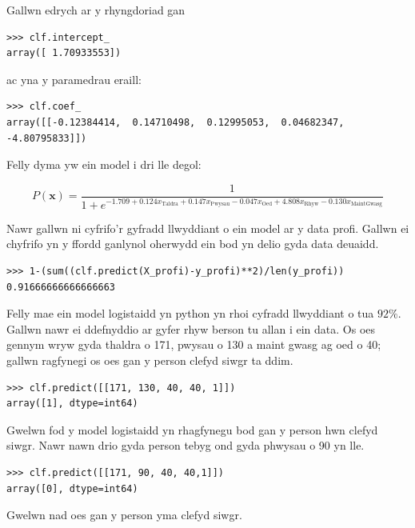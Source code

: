Gallwn edrych ar y rhyngdoriad gan

\begin{verbatim}
>>> clf.intercept_
array([ 1.70933553])
\end{verbatim}

ac yna y paramedrau eraill:

\begin{verbatim}
>>> clf.coef_
array([[-0.12384414,  0.14710498,  0.12995053,  0.04682347, -4.80795833]])
\end{verbatim}

Felly dyma yw ein model i dri lle degol:

$$ P(\mathbf{x}) = \frac{1}{1 + e^{-1.709 + 0.124 x_{\text{Taldra}} + 0.147 x_{\text{Pwysau}} - 0.047 x_{\text{Oed}} + 4.808 x_{\text{Rhyw}} - 0.130 x_{\text{MaintGwasg}}}} $$

Nawr gallwn ni cyfrifo'r gyfradd llwyddiant o ein model ar y data profi. Gallwn ei chyfrifo yn y ffordd ganlynol oherwydd ein bod yn delio gyda data deuaidd.

\begin{verbatim}
>>> 1-(sum((clf.predict(X_profi)-y_profi)**2)/len(y_profi))
0.91666666666666663
\end{verbatim}

Felly mae ein model logistaidd yn python yn rhoi cyfradd llwyddiant o tua $92\%$. Gallwn nawr ei ddefnyddio ar gyfer rhyw berson tu allan i ein data. Os oes gennym wryw gyda thaldra o 171, pwysau o 130 a maint gwasg ag oed o 40; gallwn ragfynegi os oes gan y person clefyd siwgr ta ddim. 

\begin{verbatim}
>>> clf.predict([[171, 130, 40, 40, 1]])
array([1], dtype=int64)
\end{verbatim}

Gwelwn fod y model logistaidd yn rhagfynegu bod gan y person hwn clefyd siwgr. Nawr nawn drio gyda person tebyg ond gyda phwysau o 90 yn lle.

\begin{verbatim}
>>> clf.predict([[171, 90, 40, 40,1]])
array([0], dtype=int64)
\end{verbatim}

Gwelwn nad oes gan y person yma clefyd siwgr.